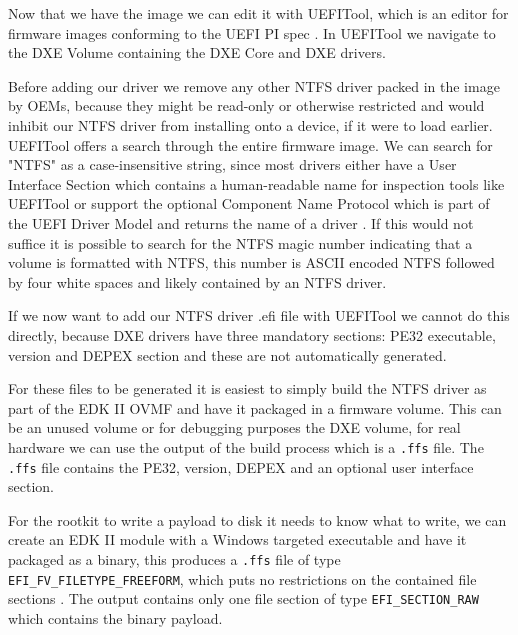 Now that we have the image we can edit it with UEFITool, which is an editor for firmware images conforming to the UEFI PI spec \cite{uefitool}.
In UEFITool we navigate to the DXE Volume containing the DXE Core and DXE drivers.

Before adding our driver we remove any other NTFS driver packed in the image by OEMs, because they might be read-only or otherwise restricted and would inhibit our NTFS driver from installing onto a device, if it were to load earlier. UEFITool offers a search through the entire firmware image. We can search for "NTFS" as a case-insensitive string, since most drivers either have a User Interface Section which contains a human-readable name for inspection tools like UEFITool \cite[Vol 3, 3.2.5]{pi-spec} or support the optional Component Name Protocol which is part of the UEFI Driver Model and returns the name of a driver \cite[11.5]{uefi-spec}. If this would not suffice it is possible to search for the NTFS magic number indicating that a volume is formatted with NTFS, this number is ASCII encoded NTFS followed by four white spaces and likely contained by an NTFS driver.

If we now want to add our NTFS driver .efi file with UEFITool we cannot do this directly, because DXE drivers have three mandatory sections: PE32 executable, version and DEPEX section \cite[Vol 3, 2.1.4.1.4]{pi-spec} and these are not automatically generated.

For these files to be generated it is easiest to simply build the \ac{NTFS} driver as part of the \ac{EDK} II \ac{OVMF} and have it packaged in a firmware volume. This can be an unused volume or for debugging purposes the \ac{DXE} volume, for real hardware we can use the output of the build process which is a \lstinline{.ffs} file. The \lstinline{.ffs} file contains the \ac{PE32}, version, \ac{DEPEX} and an optional user interface section.

For the rootkit to write a payload to disk it needs to know what to write, we can create an \ac{EDK} II module with a Windows targeted executable and have it packaged as a binary, this produces a \lstinline{.ffs} file of type \lstinline{EFI_FV_FILETYPE_FREEFORM}, which puts no restrictions on the contained file sections \cite[Vol 3, 2.1.4.1.7]{pi-spec}. The output contains only one file section of type \lstinline{EFI_SECTION_RAW} which contains the binary payload.

